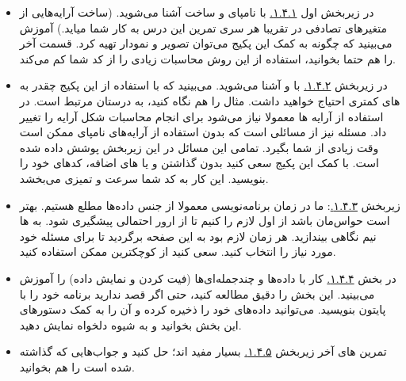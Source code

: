 \documentclass[11pt, a4paper]{article}
\begin{document}
\begin{itemize}[label=\Large $\bullet$]
	\item 
	در زیربخش اول
  \href{https://scipy-lectures.org/intro/numpy/array_object.html}{۱.۴.۱.}
  با نامپای و ساخت
  آشنا می‌شوید.
	(ساخت آرایه‌هایی از متغیرهای تصادفی در تقریبا هر سری تمرین این درس به کار شما میاید.)
	آموزش می‌بینید که چگونه به کمک این پکیج می‌توان تصویر و نمودار تهیه کرد. 
	قسمت آخر
  \href{https://scipy-lectures.org/intro/numpy/array_object.html#fancy-indexing}{}
  را هم حتما بخوانید، استفاده از این روش محاسبات زیادی را از کد شما کم می‌کند.
	
	\item
	در زیربخش
  \href{https://scipy-lectures.org/intro/numpy/operations.html}{۱.۴.۲.}
  با
  و
  آشنا می‌شوید. 
  می‌بینید که با استفاده از این پکیج چقدر به
  های کمتری احتیاج خواهید داشت. 
  مثال
  را هم نگاه کنید، به درستان مرتبط است. 
  در استفاده از آرایه ها معمولا نیاز می‌شود برای انجام محاسبات شکل آرایه را تغییر داد. 
  مسئله
  نیز از مسائلی است که بدون استفاده از آرایه‌های نامپای ممکن است وقت زیادی از شما بگیرد. 
  تمامی این مسائل در این زیربخش پوشش داده شده است.
  با کمک این پکیج سعی کنید بدون گذاشتن
  و یا
  های اضافه، کدهای خود را بنویسید.
  این کار به کد شما سرعت و تمیزی می‌بخشد.

\item
  زیربخش
  \href{https://scipy-lectures.org/intro/numpy/elaborate_arrays.html}{۱.۴.۳.}:
  ما در زمان برنامه‌نویسی معمولا از جنس داده‌ها مطلع هستیم. 
  بهتر است حواس‌مان باشد از اول
  لازم را
  کنیم تا از ارور احتمالی پیشگیری شود.
  به
  ها نیم نگاهی بیندازید. هر زمان لازم بود به این صفحه برگردید تا برای مسئله خود
  مورد نیاز را انتخاب کنید.
  سعی کنید از کوچکترین
  ممکن استفاده کنید.

\item 
  در بخش
  \href{https://scipy-lectures.org/intro/numpy/advanced_operations.html}{۱.۴.۴.}
  کار با داده‌ها و چندجمله‌ای‌ها (فیت کردن و نمایش داده) را آموزش می‌بینید. 
  این بخش را دقیق مطالعه کنید، حتی اگر قصد ندارید برنامه خود را با پایتون بنویسید.
  می‌توانید داده‌های خود را ذخیره کرده و آن را به کمک دستورهای این بخش بخوانید و به شیوه دلخواه نمایش دهید.

\item
  تمرین های آخر زیربخش
  \href{https://scipy-lectures.org/intro/numpy/exercises.html}{۱.۴.۵.}
  بسیار مفید اند؛
  حل کنید و جواب‌هایی که گذاشته شده است را هم بخوانید.

\end{itemize}
\end{document}
